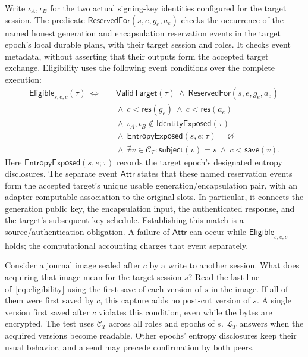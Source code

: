 Write $\iota_A,\iota_B$ for the two actual signing-key identities configured
for the target session.  The predicate
$\mathsf{ReservedFor}(s,e,g_e,a_e)$ checks the occurrence of the named honest
generation and encapsulation reservation events in the target epoch's local
durable plans, with their target session and roles.  It checks event metadata,
without asserting that their outputs form the accepted target exchange.
Eligibility uses the following event conditions over the complete execution:
\begin{align}
 \mathsf{Eligible}_{s,e,c}(\tau)\ \Longleftrightarrow\quad&
 \mathsf{ValidTarget}(\tau)
 \ \wedge\ \mathsf{ReservedFor}(s,e,g_e,a_e)
 \nonumber\\[-1mm]
 &{}\wedge\ c<\mathsf{res}(g_e)
          \ \wedge\ c<\mathsf{res}(a_e)
 \nonumber\\
 &{}\wedge\ \iota_A,\iota_B
                  \notin\mathsf{IdentityExposed}(\tau)
 \nonumber\\
 &{}\wedge\ \mathsf{EntropyExposed}(s,e;\tau)=\varnothing
 \nonumber\\
 &{}\wedge\ \nexists v\in\mathcal C_T:
       \mathsf{subject}(v)=s\ \wedge\ c<\mathsf{save}(v).
 \label{eq:eligibility}
\end{align}
Here $\mathsf{EntropyExposed}(s,e;\tau)$ records the target epoch's designated
entropy disclosures.  The separate event $\mathsf{Attr}$ states that these
named reservation events form the accepted target's unique usable
generation/encapsulation pair, with an adapter-computable association to the
original slots.  In particular, it connects the generation public key, the
encapsulation input, the authenticated response, and the target's subsequent
key schedule. Establishing this match is a source/authentication obligation.
A failure of $\mathsf{Attr}$ can occur while
$\mathsf{Eligible}_{s,e,c}$ holds; the computational accounting charges
that event separately.

Consider a journal image sealed after $c$ by a write to another session.
What does acquiring that image mean for the target session $s$? Read the
last line of~\eqref{eq:eligibility} using the first save of each version
of $s$ in the image. If all of them were first saved by $c$, this
capture adds no post-cut version of $s$. A single version first
saved after $c$ violates this condition, even while the bytes are encrypted. The
test uses $\mathcal C_T$ across all roles and epochs of $s$.
$\mathcal L_T$ answers when the acquired versions become readable.
Other epochs' entropy disclosures keep their usual behavior, and a send
may precede confirmation by both peers.

